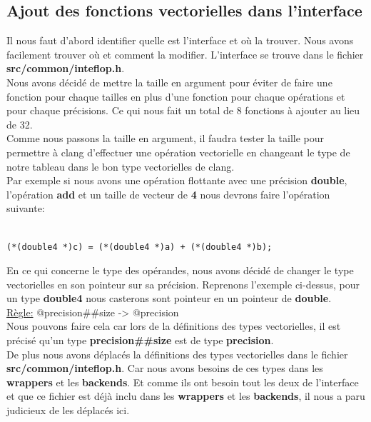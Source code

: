 \documentclass[11pt]{article}
\begin{document}
\subsection{Ajout des fonctions vectorielles dans l'interface}
\label{sec:orgc9e1d9f}

Il nous faut d'abord identifier quelle est l'interface et où la
trouver. Nous avons facilement trouver où et comment la
modifier. L'interface se trouve dans le fichier
\textbf{src/common/inteflop.h}.
\\ \vspace{5mm}
Nous avons décidé de mettre la taille en argument pour éviter de
faire une fonction pour chaque tailles en plus d'une fonction pour
chaque opérations et pour chaque précisions. Ce qui nous fait un
total de 8 fonctions à ajouter au lieu de 32.
\\ \vspace{5mm}
Comme nous passons la taille en argument, il faudra tester la
taille pour permettre à clang d'effectuer une opération vectorielle
en changeant le type de notre tableau dans le bon type vectorielles de clang.
\\ \vspace{5mm}
Par exemple si nous avons une opération flottante avec une
précision \textbf{double}, l'opération \textbf{add} et un taille de vecteur
de \textbf{4} nous devrons faire l'opération suivante:

\begin{verbatim}

(*(double4 *)c) = (*(double4 *)a) + (*(double4 *)b);

\end{verbatim}

En ce qui concerne le type des opérandes, nous avons décidé de
changer le type vectorielles en son pointeur sur sa
précision. Reprenons l'exemple ci-dessus, pour un type \textbf{double4}
nous casterons sont pointeur en un pointeur de \textbf{double}.
\\ \vspace{5mm}
\uline{Règle:} @precision\#\#size -> @precision
\\ \vspace{5mm}
Nous pouvons faire cela car lors de la définitions des types
vectorielles, il est précisé qu'un type \textbf{precision\#\#size} est de type
\textbf{precision}.
\\ \vspace{5mm}
De plus nous avons déplacés la définitions des types vectorielles dans le
fichier \textbf{src/common/inteflop.h}. Car nous avons besoins de ces types dans les
\textbf{wrappers} et les \textbf{backends}. Et comme ils ont besoin tout les deux de
l'interface et que ce fichier est déjà inclu dans les \textbf{wrappers} et les
\textbf{backends}, il nous a paru judicieux de les déplacés ici.
\end{document}
